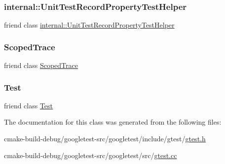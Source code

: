 \mbox{\label{classtesting_1_1UnitTest_ae970f89a9f477a349fe5778be85ef42e}} 
\subsubsection{\texorpdfstring{internal::UnitTestRecordPropertyTestHelper}{internal::UnitTestRecordPropertyTestHelper}}
{\footnotesize\ttfamily friend class \mbox{\hyperlink{classtesting_1_1internal_1_1UnitTestRecordPropertyTestHelper}{internal\+::\+Unit\+Test\+Record\+Property\+Test\+Helper}}\hspace{0.3cm}{\ttfamily [friend]}}

\mbox{\label{classtesting_1_1UnitTest_ada54bdd5bdc24f39b9ca16807326654a}} 
\subsubsection{\texorpdfstring{ScopedTrace}{ScopedTrace}}
{\footnotesize\ttfamily friend class \mbox{\hyperlink{classtesting_1_1ScopedTrace}{Scoped\+Trace}}\hspace{0.3cm}{\ttfamily [friend]}}

\mbox{\label{classtesting_1_1UnitTest_a5b78b1c2e1fa07ffed92da365593eaa4}} 
\subsubsection{\texorpdfstring{Test}{Test}}
{\footnotesize\ttfamily friend class \mbox{\hyperlink{classtesting_1_1Test}{Test}}\hspace{0.3cm}{\ttfamily [friend]}}



The documentation for this class was generated from the following files\+:\begin{DoxyCompactItemize}
\item 
cmake-\/build-\/debug/googletest-\/src/googletest/include/gtest/\mbox{\hyperlink{gtest_8h}{gtest.\+h}}\item 
cmake-\/build-\/debug/googletest-\/src/googletest/src/\mbox{\hyperlink{gtest_8cc}{gtest.\+cc}}\end{DoxyCompactItemize}
